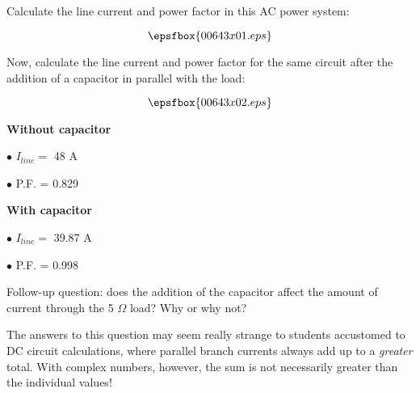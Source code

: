 

Calculate the line current and power factor in this AC power system:

$$\epsfbox{00643x01.eps}$$

Now, calculate the line current and power factor for the same circuit after the addition of a capacitor in parallel with the load:

$$\epsfbox{00643x02.eps}$$







\medskip
\goodbreak
\item{} {\bf Without capacitor}
\item{$\bullet$} $I_{line} =$ 48 A
\item{$\bullet$} P.F. = 0.829
\medskip

\medskip
\goodbreak
\item{} {\bf With capacitor}
\item{$\bullet$} $I_{line} =$ 39.87 A
\item{$\bullet$} P.F. = 0.998
\medskip

\vskip 10pt

Follow-up question: does the addition of the capacitor affect the amount of current through the 5 $\Omega$ load?  Why or why not?







The answers to this question may seem really strange to students accustomed to DC circuit calculations, where parallel branch currents always add up to a {\it greater} total.  With complex numbers, however, the sum is not necessarily greater than the individual values!




